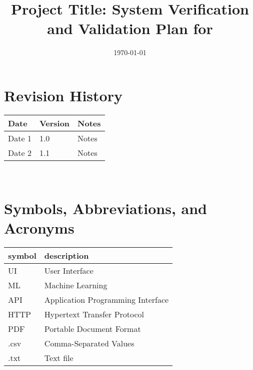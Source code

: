 \documentclass[12pt, titlepage]{article}
\begin{document}
\title{Project Title: System Verification and Validation Plan for \progname{}} 
\author{\authname}
\date{\today}
	
\maketitle


\section*{Revision History}

\begin{tabularx}{\textwidth}{p{3cm}p{2cm}X}
\toprule {\bf Date} & {\bf Version} & {\bf Notes}\\
\midrule
Date 1 & 1.0 & Notes\\
Date 2 & 1.1 & Notes\\
\bottomrule
\end{tabularx}

~\\

\newpage

\tableofcontents

\listoftables


\listoffigures


\newpage

\section{Symbols, Abbreviations, and Acronyms}

\renewcommand{\arraystretch}{1.2}
\begin{tabular}{l l} 
  \toprule		
  \textbf{symbol} & \textbf{description}\\
  \midrule 
      UI & User Interface \\
      ML & Machine Learning\\
      API & Application Programming Interface\\
      HTTP & Hypertext Transfer Protocol\\
      PDF & Portable Document Format\\
      .csv & Comma-Separated Values \\
      .txt & Text file\\
  \bottomrule
\end{tabular}\\

\newpage
\end{document}
